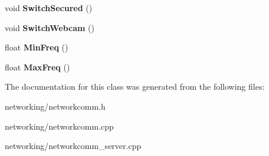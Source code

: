\begin{DoxyCompactItemize}
\item 
void {\bfseries Switch\+Secured} ()\hypertarget{classNetworkCommunication_a5d95a859af08a4ad9e93eff28c5772c7}{}\label{classNetworkCommunication_a5d95a859af08a4ad9e93eff28c5772c7}

\item 
void {\bfseries Switch\+Webcam} ()\hypertarget{classNetworkCommunication_ae629c24a46ec85637ab0a146dc46b488}{}\label{classNetworkCommunication_ae629c24a46ec85637ab0a146dc46b488}

\item 
float {\bfseries Min\+Freq} ()\hypertarget{classNetworkCommunication_a13b68a995011a59bbff64f5f1e68b085}{}\label{classNetworkCommunication_a13b68a995011a59bbff64f5f1e68b085}

\item 
float {\bfseries Max\+Freq} ()\hypertarget{classNetworkCommunication_a763ece36c8784b582d74b285fcaef135}{}\label{classNetworkCommunication_a763ece36c8784b582d74b285fcaef135}

\end{DoxyCompactItemize}


The documentation for this class was generated from the following files\+:\begin{DoxyCompactItemize}
\item 
networking/networkcomm.\+h\item 
networking/networkcomm.\+cpp\item 
networking/networkcomm\+\_\+server.\+cpp\end{DoxyCompactItemize}

